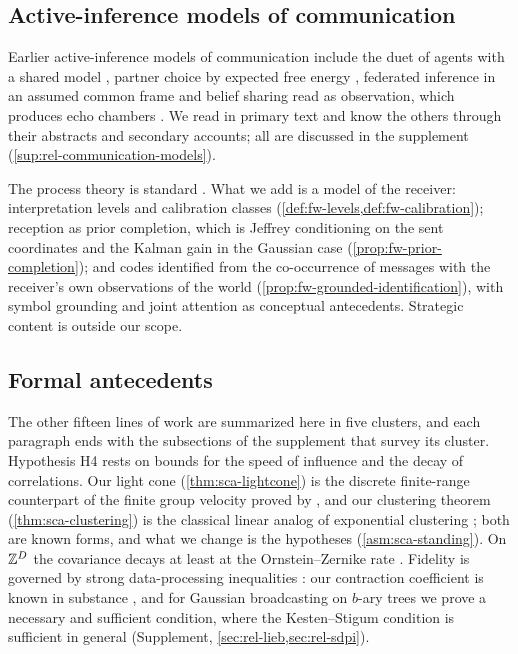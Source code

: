 \subsection{Active-inference models of communication}\label{sec:rel-communication}

Earlier active-inference models of communication include the duet of agents with a shared model \citep{friston2015duet,friston2015hermeneutics}, partner choice by expected free energy \citep{albarracin2022epistemic,kastel2023small}, federated inference in an assumed common frame \citep{friston2024federated} and belief sharing read as observation, which produces echo chambers \citep{catal2025belief}. We read \citet{friston2024federated} in primary text and know the others through their abstracts and secondary accounts; all are discussed in the supplement (\cref{sup:rel-communication-models}).

The process theory is standard \citep{dacosta2020active}. What we add is a model of the receiver: interpretation levels and calibration classes (\cref{def:fw-levels,def:fw-calibration}); reception as prior completion, which is Jeffrey conditioning on the sent coordinates \citep{jeffrey1965logic} and the Kalman gain \citep{kalman1960new} in the Gaussian case (\cref{prop:fw-prior-completion}); and codes identified from the co-occurrence of messages with the receiver's own observations of the world (\cref{prop:fw-grounded-identification}), with symbol grounding \citep{harnad1990symbol} and joint attention \citep{tomasello2005understanding} as conceptual antecedents. Strategic content \citep{crawford1982strategic} is outside our scope.

\subsection{Formal antecedents}\label{sec:rel-formal}

The other fifteen lines of work are summarized here in five clusters, and each paragraph ends with the subsections of the supplement that survey its cluster. Hypothesis H4 rests on bounds for the speed of influence and the decay of correlations. Our light cone (\cref{thm:sca-lightcone}) is the discrete finite-range counterpart of the finite group velocity proved by \citet{lieb1972finite}, and our clustering theorem (\cref{thm:sca-clustering}) is the classical linear analog of exponential clustering \citep{nachtergaele2006lieb,hastings2006spectral}; both are known forms, and what we change is the hypotheses (\cref{asm:sca-standing}). On $\mathbb{Z}^D$ the covariance decays at least at the Ornstein--Zernike rate \citep{ornstein1914accidental}. Fidelity is governed by strong data-processing inequalities \citep{ahlswede1976spreading}: our contraction coefficient is known in substance \citep{makur2020comparison}, and for Gaussian broadcasting on $b$-ary trees we prove a necessary and sufficient condition, where the Kesten--Stigum condition \citep{kesten1966additional} is sufficient in general (Supplement, \cref{sec:rel-lieb,sec:rel-sdpi}).

